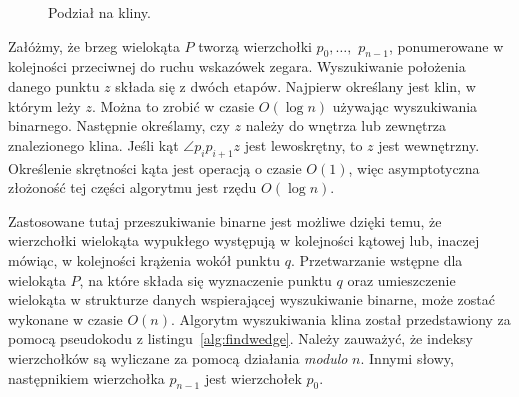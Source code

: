 \begin{figure}[htp]
  \centering
  \caption{Podział na kliny.\label{fig:location3}}
\end{figure}

Załóżmy, że brzeg wielokąta $P$ tworzą wierzchołki $p_0, \ldots,$
$p_{n-1}$, ponumerowane w kolejności przeciwnej do ruchu wskazówek
zegara. Wyszukiwanie położenia danego punktu $z$ składa się z dwóch
etapów. Najpierw określany jest klin, w którym leży $z$. Można to
zrobić w czasie $O(\log n)$ używając wyszukiwania binarnego.
Następnie określamy, czy $z$ należy do wnętrza lub zewnętrza
znalezionego klina. Jeśli kąt $\angle p_{i}p_{i+1}z$ jest lewoskrętny,
to $z$ jest wewnętrzny. Określenie skrętności kąta jest operacją o
czasie $O(1)$, więc asymptotyczna złożoność tej części algorytmu jest
rzędu $O(\log n)$.

Zastosowane tutaj przeszukiwanie binarne jest możliwe dzięki temu, że
wierzchołki wielokąta wypukłego występują w kolejności kątowej lub,
inaczej mówiąc, w kolejności krążenia wokół punktu $q$. Przetwarzanie
wstępne dla wielokąta $P$, na które składa się wyznaczenie punktu $q$
oraz umieszczenie wielokąta w strukturze danych wspierającej
wyszukiwanie binarne, może zostać wykonane w czasie $O(n)$. Algorytm
wyszukiwania klina został przedstawiony za pomocą pseudokodu z
listingu~\ref{alg:findwedge}. Należy zauważyć, że indeksy wierzchołków
są wyliczane za pomocą działania \emph{modulo} $n$. Innymi słowy,
następnikiem wierzchołka $p_{n-1}$ jest wierzchołek $p_0$.

